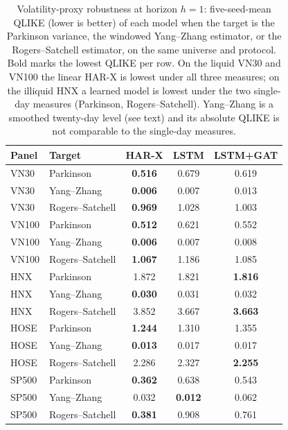 \documentclass[runningheads]{llncs}
\begin{document}
\begin{table}[t]
\centering
\caption{Volatility-proxy robustness at horizon $h{=}1$: five-seed-mean QLIKE (lower is better) of each model
when the target is the Parkinson variance, the windowed Yang--Zhang estimator, or the Rogers--Satchell
estimator, on the same universe and protocol. Bold marks the lowest QLIKE per row. On the liquid VN30 and VN100
the linear HAR-X is lowest under all three measures; on the illiquid HNX a learned model is lowest under the two
single-day measures (Parkinson, Rogers--Satchell). Yang--Zhang is a smoothed twenty-day level (see text) and its
absolute QLIKE is not comparable to the single-day measures.}
\label{tab:proxy}
\footnotesize
\setlength{\tabcolsep}{6pt}
\begin{tabular}{llccc}
\toprule
Panel & Target & HAR-X & LSTM & LSTM+GAT \\
\midrule
VN30  & Parkinson       & \textbf{0.516} & 0.679 & 0.619 \\
VN30  & Yang--Zhang     & \textbf{0.006} & 0.007 & 0.013 \\
VN30  & Rogers--Satchell& \textbf{0.969} & 1.028 & 1.003 \\
\midrule
VN100 & Parkinson       & \textbf{0.512} & 0.621 & 0.552 \\
VN100 & Yang--Zhang     & \textbf{0.006} & 0.007 & 0.008 \\
VN100 & Rogers--Satchell& \textbf{1.067} & 1.186 & 1.085 \\
\midrule
HNX   & Parkinson       & 1.872 & 1.821 & \textbf{1.816} \\
HNX   & Yang--Zhang     & \textbf{0.030} & 0.031 & 0.032 \\
HNX   & Rogers--Satchell& 3.852 & 3.667 & \textbf{3.663} \\
\midrule
HOSE  & Parkinson       & \textbf{1.244} & 1.310 & 1.355 \\
HOSE  & Yang--Zhang     & \textbf{0.013} & 0.017 & 0.017 \\
HOSE  & Rogers--Satchell& 2.286 & 2.327 & \textbf{2.255} \\
\midrule
SP500 & Parkinson       & \textbf{0.362} & 0.638 & 0.543 \\
SP500 & Yang--Zhang     & 0.032 & \textbf{0.012} & 0.062 \\
SP500 & Rogers--Satchell& \textbf{0.381} & 0.908 & 0.761 \\
\bottomrule
\end{tabular}
\end{table}
\end{document}
